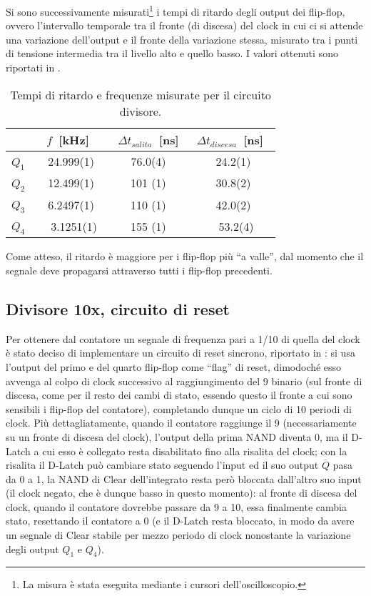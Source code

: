 Si sono successivamente misurati\footnote{La misura è stata eseguita mediante i cursori dell'oscilloscopio.} i tempi di ritardo degli output dei flip-flop, ovvero l'intervallo temporale tra il fronte (di discesa) del clock in cui ci si attende una variazione dell'output e il fronte della variazione stessa, misurato tra i punti di tensione intermedia tra il livello alto e quello basso. I valori ottenuti sono riportati in . %

\begin{table}[h]
	\centering
	\begin{tabular}{l S[table-figures-decimal=4, table-figures-uncertainty=1] S[table-figures-decimal=1, table-figures-integer=3, table-figures-uncertainty=1] S[table-figures-decimal=1, table-figures-uncertainty=1] }
		\toprule
			& {$f$ [\si{\kHz}]} & {$\Delta t_{salita}$ [\si{\ns}]} & {$\Delta t_{discesa}$ [\si{\ns}]} \\
		\midrule
		$Q_1$ & 24.999(1) & 76.0(4) & 24.2(1) \\
		$Q_2$ & 12.499(1) & 101 (1) & 30.8(2) \\
		$Q_3$ & 6.2497(1) & 110 (1) & 42.0(2) \\
		$Q_4$ & 3.1251(1) & 155 (1) & 53.2(4) \\
		\bottomrule
	\end{tabular}
	\caption{Tempi di ritardo e frequenze misurate per il circuito divisore.}
	\label{tab:divlag}
\end{table}

Come atteso, il ritardo è maggiore per i flip-flop più ``a valle'', dal momento che il segnale deve propagarsi attraverso tutti i flip-flop precedenti.

\subsection{Divisore 10x, circuito di reset}
Per ottenere dal contatore un segnale di frequenza pari a 1/10 di quella del clock è stato deciso di implementare un circuito di reset sincrono, riportato in : si usa l'output del primo e del quarto flip-flop come ``flag'' di reset, dimodoché esso avvenga al colpo di clock successivo al raggiungimento del 9 binario (sul fronte di discesa, come per il resto dei cambi di stato, essendo questo il fronte a cui sono sensibili i flip-flop del contatore), completando dunque un ciclo di 10 periodi di clock.
Più dettagliatamente, quando il contatore raggiunge il 9 (necessariamente su un fronte di discesa del clock), l'output della prima NAND diventa 0, ma il D-Latch a cui esso è collegato resta disabilitato fino alla risalita del clock; con la risalita il D-Latch può cambiare stato seguendo l'input ed il suo output $\overline{Q}$ pasa da 0 a 1, la NAND di Clear dell'integrato resta però bloccata dall'altro suo input (il clock negato, che è dunque basso in questo momento): al fronte di discesa del clock, quando il contatore dovrebbe passare da 9 a 10, essa finalmente cambia stato, resettando il contatore a 0 (e il D-Latch resta bloccato, in modo da avere un segnale di Clear stabile per mezzo periodo di clock nonostante la variazione degli output $Q_1$ e $Q_4$).

